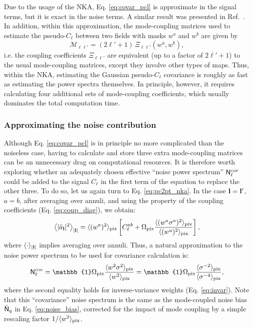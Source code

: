 \documentclass[a4paper,11pt]{article}
\begin{document}
        Due to the usage of the NKA, Eq. \ref{eq:covar_pcl} is approximate in the signal terms, but it is exact in the noise terms. A similar result was presented in Ref.~\cite{1811.05714}. In addition, within this approximation, the mode-coupling matrices used to estimate the pseudo-$C_\ell$ between two fields with masks $w^a$ and $w^b$ are given by
        \begin{equation}     
          \mathcal{M}_{\ell\ell'}=(2\ell'+1)\,\Xi_{\ell\ell'}(w^a,w^b),
        \end{equation}
        i.e. the coupling coefficients $\Xi_{\ell\ell'}$ are equivalent (up to a factor of $2\ell'+1$) to the usual mode-coupling matrices, except they involve other types of maps. Thus, within the NKA, estimating the Gaussian pseudo-$C_\ell$ covariance is roughly as fast as estimating the power spectra themselves. In principle, however, it requires calculating four additional sets of mode-coupling coefficients, which usually dominates the total computation time.

      \subsubsection{Approximating the noise contribution}\label{sssec:pcl.covar.noise}
        Although Eq. \ref{eq:covar_pcl} is in principle no more complicated than the noiseless case, having to calculate and store three extra mode-coupling matrices can be an unnecessary drag on computational resources. It is therefore worth exploring whether an adequately chosen effective ``noise power spectrum'' ${\sf N}_\ell^{\rm cov}$ could be added to the signal $C_\ell$ in the first term of the equation to replace the other three. To do so, let us again turn to Eq. \ref{eq:pc2pt_nka}. In the case ${\bf l}={\bf l}'$, $a=b$, after averaging over annuli, and using the property of the coupling coefficients (Eq. \ref{eq:coup_diag}), we obtain:
        \begin{equation}
          \left\langle |\tilde{a}_{\bf l}|^2\right\rangle_{|{\bf l}|}=\langle (w^a)^2\rangle_{\rm pix}\left[C^{ab}_\ell+\Omega_{\rm pix}\frac{\langle (w^a\sigma^a)^2\rangle_{\rm pix}}{\langle (w^a)^2\rangle_{\rm pix}}\right],
        \end{equation}
        where $\langle\cdot\rangle_{|{\bf l}|}$ implies averaging over annuli. Thus, a natural approximation to the noise power spectrum to be used for covariance calculation is:
        \begin{equation}\label{eq:noicov}
          {\sf N}_\ell^{\rm cov}=\mathbb{1}\Omega_{\rm pix}\frac{\langle w^2 \sigma^2\rangle_{\rm pix}}{\langle w^2\rangle_{\rm pix}}=\mathbb{1}\Omega_{\rm pix}\frac{\langle \sigma^{-2}\rangle_{\rm pix}}{\langle \sigma^{-4}\rangle_{\rm pix}},
        \end{equation}
        where the second equality holds for inverse-variance weights (Eq. \ref{eq:invar}). Note that this ``covariance'' noise spectrum is the same as the mode-coupled noise bias $\tilde{\sf N}_q$ in Eq. \ref{eq:noise_bias}, corrected for the impact of mode coupling by a simple rescaling factor $1/\langle w^2\rangle_{\rm pix}$. 
\end{document}
